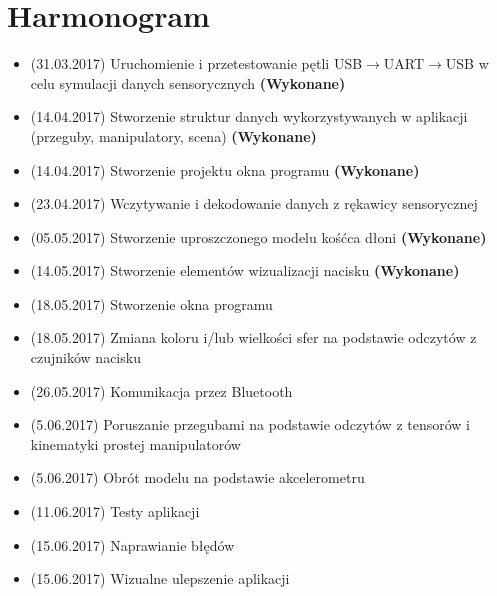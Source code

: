 \documentclass[12pt,a4paper]{article}
\begin{document}
\newpage
\section{Harmonogram}
\begin{itemize}
\item (31.03.2017) Uruchomienie i przetestowanie pętli USB$\rightarrow $UART$\rightarrow $USB w celu symulacji danych sensorycznych \textbf{(Wykonane)}
\item (14.04.2017) Stworzenie struktur danych wykorzystywanych w aplikacji (przeguby, manipulatory, scena) \textbf{(Wykonane)}
\item (14.04.2017) Stworzenie projektu okna programu \textbf{(Wykonane)}
\item (23.04.2017) Wczytywanie i dekodowanie danych z rękawicy sensorycznej
\item (05.05.2017) Stworzenie uproszczonego modelu kośćca dłoni \textbf{(Wykonane)}
\item (14.05.2017) Stworzenie elementów wizualizacji nacisku \textbf{(Wykonane)}
\item (18.05.2017) Stworzenie okna programu
\item (18.05.2017) Zmiana koloru i/lub wielkości sfer na podstawie odczytów z czujników nacisku
\item (26.05.2017) Komunikacja przez Bluetooth
\item (5.06.2017) Poruszanie przegubami na podstawie odczytów z tensorów i kinematyki prostej manipulatorów
\item (5.06.2017) Obrót modelu na podstawie akcelerometru
\item (11.06.2017) Testy aplikacji
\item (15.06.2017) Naprawianie błędów
\item (15.06.2017) Wizualne ulepszenie aplikacji
\end{itemize}


\end{document}
